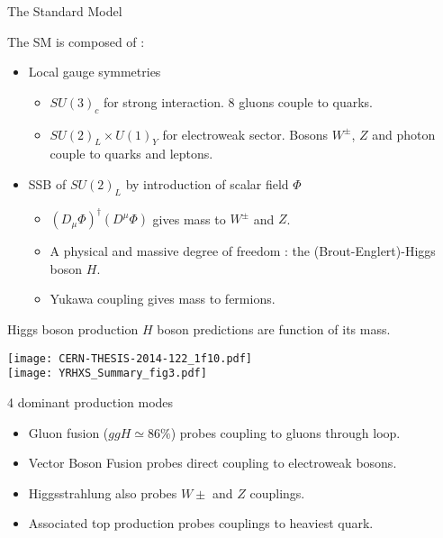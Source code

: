 \begin{frame}{The Standard Model}
  
  The SM is composed of :
  
  \begin{itemize}
  \item Local gauge symmetries
    \begin{itemize}
    \item $SU(3)_c$ for strong interaction. 8 gluons couple to quarks.
    \item $SU(2)_L\times U(1)_Y$ for electroweak sector. Bosons $W^\pm$, $Z$ and photon couple to quarks and leptons.
    \end{itemize}
    \vfill
  \item SSB of $SU(2)_L$ by introduction of scalar field $\Phi$
    \begin{itemize}
    \item $(D_\mu \Phi)^\dagger (D^\mu\Phi)$ gives mass to $W^\pm$ and $Z$.
    \item A physical and massive degree of freedom : the (Brout-Englert)-Higgs boson $H$.
    \item Yukawa coupling gives mass to fermions.
    \end{itemize}
  \end{itemize}
\end{frame}
\begin{frame}{Higgs boson production}
  $H$ boson predictions are function of its mass.
  
  \begin{minipage}{0.44\linewidth}
    \centering
    \texttt{[image: CERN-THESIS-2014-122\_1f10.pdf]}\\
    \texttt{[image: YRHXS\_Summary\_fig3.pdf]}
  \end{minipage}
  \hfill
  \begin{minipage}{0.55\linewidth}
    4 dominant production modes
    \begin{itemize}
    \item Gluon fusion ($ggH\simeq 86\%$) probes coupling to gluons through loop.
    \item Vector Boson Fusion probes direct coupling to electroweak bosons.
    \item Higgsstrahlung also probes $W\pm$ and $Z$ couplings.
    \item Associated top production probes couplings to heaviest quark.
    \end{itemize}
  \end{minipage}
\end{frame}

